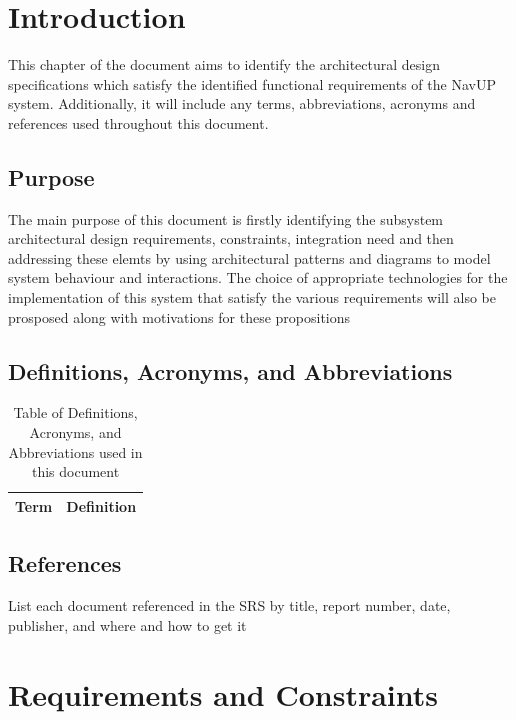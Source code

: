 \documentclass{article}
\begin{document}
	\thispagestyle{empty}
	\listoffigures
	\cleardoublepage
	\setcounter{page}{1}
	
	
	\section{Introduction}\label{sec:intro}
		This chapter of the document aims to identify the architectural design specifications which satisfy the identified functional requirements of the NavUP system. Additionally, it will include any terms, abbreviations, acronyms and references used throughout this document.
	
		\subsection{Purpose}\label{subsec:purpose}
			The main purpose of this document is firstly identifying the subsystem architectural design requirements, constraints, integration need  and then addressing these elemts by using architectural patterns and diagrams to model system behaviour and interactions. The choice of appropriate technologies for the implementation of this system that satisfy the various requirements will also be prosposed along with motivations for these propositions 
				
		\subsection{Definitions, Acronyms, and Abbreviations}\label{subsec:daa}
			\begin{table}[h!]
				\centering
				\caption{Table of Definitions, Acronyms, and Abbreviations used in this document}
				\label{tab: Table 1}
				\begin{tabular}{| m{4cm} | m{12cm} |}
					\hline
					\textbf{Term} & \textbf{Definition} \\
					\hline
					\hline
					
				\end{tabular}
			\end{table}
	
		\subsection{References}\label{subsec:references}
		List each document referenced in the SRS by title, report number, date, publisher, and where and how to get it
		
	\section{Requirements and Constraints}\label{sec:requirements}
\end{document}
